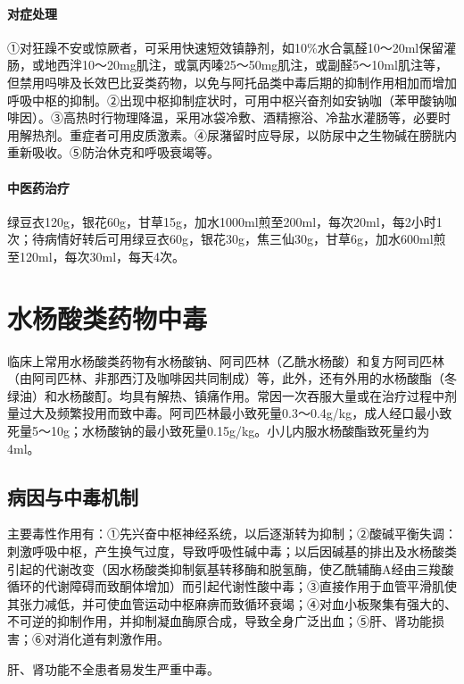 \paragraph{对症处理}

①对狂躁不安或惊厥者，可采用快速短效镇静剂，如10\%水合氯醛10～20ml保留灌肠，或地西泮10～20mg肌注，或氯丙嗪25～50mg肌注，或副醛5～10ml肌注等，但禁用吗啡及长效巴比妥类药物，以免与阿托品类中毒后期的抑制作用相加而增加呼吸中枢的抑制。②出现中枢抑制症状时，可用中枢兴奋剂如安钠咖（苯甲酸钠咖啡因）。③高热时行物理降温，采用冰袋冷敷、酒精擦浴、冷盐水灌肠等，必要时用解热剂。重症者可用皮质激素。④尿潴留时应导尿，以防尿中之生物碱在膀胱内重新吸收。⑤防治休克和呼吸衰竭等。

\paragraph{中医药治疗}

绿豆衣120g，银花60g，甘草15g，加水1000ml煎至200ml，每次20ml，每2小时1次；待病情好转后可用绿豆衣60g，银花30g，焦三仙30g，甘草6g，加水600ml煎至120ml，每次30ml，每天4次。

\protect\hypertarget{text00136.html}{}{}

\section{水杨酸类药物中毒}

临床上常用水杨酸类药物有水杨酸钠、阿司匹林（乙酰水杨酸）和复方阿司匹林（由阿司匹林、非那西汀及咖啡因共同制成）等，此外，还有外用的水杨酸酯（冬绿油）和水杨酸酊。均具有解热、镇痛作用。常因一次吞服大量或在治疗过程中剂量过大及频繁投用而致中毒。阿司匹林最小致死量0.3～0.4g/kg，成人经口最小致死量5～10g；水杨酸钠的最小致死量0.15g/kg。小儿内服水杨酸酯致死量约为4ml。

\subsection{病因与中毒机制}

主要毒性作用有：①先兴奋中枢神经系统，以后逐渐转为抑制；②酸碱平衡失调：刺激呼吸中枢，产生换气过度，导致呼吸性碱中毒；以后因碱基的排出及水杨酸类引起的代谢改变（因水杨酸类抑制氨基转移酶和脱氢酶，使乙酰辅酶A经由三羧酸循环的代谢障碍而致酮体增加）而引起代谢性酸中毒；③直接作用于血管平滑肌使其张力减低，并可使血管运动中枢麻痹而致循环衰竭；④对血小板聚集有强大的、不可逆的抑制作用，并抑制凝血酶原合成，导致全身广泛出血；⑤肝、肾功能损害；⑥对消化道有刺激作用。

肝、肾功能不全患者易发生严重中毒。

